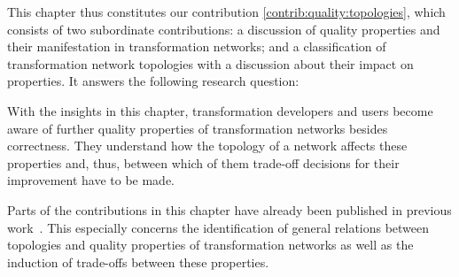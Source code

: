 This chapter thus constitutes our contribution \autoref{contrib:quality:topologies}, which consists of two subordinate contributions: a discussion of quality properties and their manifestation in transformation networks; and a classification of transformation network topologies with a discussion about their impact on properties.
It answers the following research question:


With the insights in this chapter, transformation developers and users become aware of further quality properties of transformation networks besides correctness.
They understand how the topology of a network affects these properties and, thus, between which of them trade-off decisions for their improvement have to be made.

Parts of the contributions in this chapter have already been published in previous work~.
This especially concerns the identification of general relations between topologies and quality properties of transformation networks as well as the induction of trade-offs between these properties.





